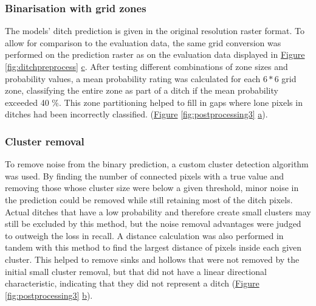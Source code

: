 \documentclass[]{interact}
\theoremstyle{plain}%
\theoremstyle{definition}
\theoremstyle{remark}
\begin{document}
\subsubsection{Binarisation with grid zones}
The models' ditch prediction is given in the original resolution raster format. To allow for comparison to the evaluation data, the same grid conversion was performed on the prediction raster as on the evaluation data displayed in \hyperref[fig:ditchpreprocess]{Figure} \ref{fig:ditchpreprocess} \hyperref[fig:ditchpreprocess]{c}. After testing different combinations of zone sizes and probability values, a mean probability rating was calculated for each $6*6$ grid zone, classifying the entire zone as part of a ditch if the mean probability exceeded 40 \%. This zone partitioning helped to fill in gaps where lone pixels in ditches had been incorrectly classified. (\hyperref[fig:postprocessing3]{Figure} \ref{fig:postprocessing3} \hyperref[fig:postprocessing3]{a}).

\subsubsection{Cluster removal}
To remove noise from the binary prediction, a custom cluster detection algorithm was used. By finding the number of connected pixels with a true value and removing those whose cluster size were below a given threshold, minor noise in the prediction could be removed while still retaining most of the ditch pixels. Actual ditches that have a low probability and therefore create small clusters may still be excluded by this method, but the noise removal advantages were judged to outweigh the loss in recall. A distance calculation was also performed in tandem with this method to find the largest distance of pixels inside each given cluster. This helped to remove sinks and hollows that were not removed by the initial small cluster removal, but that did not have a linear directional characteristic, indicating that they did not represent a ditch (\hyperref[fig:postprocessing3]{Figure} \ref{fig:postprocessing3} \hyperref[fig:postprocessing3]{b}).
\end{document}
